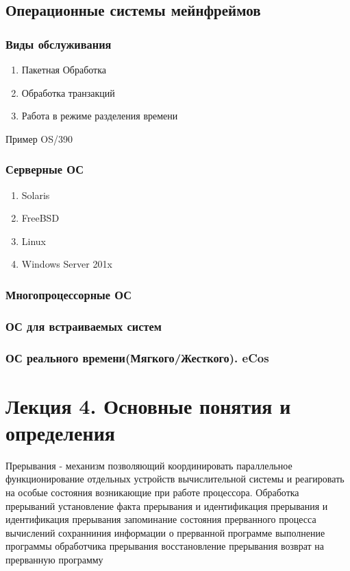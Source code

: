 \documentclass[a4paper]{article}
\begin{document}
\subsection{Операционные системы мейнфреймов}

\subsubsection{Виды обслуживания} 
\begin{enumerate}
\item Пакетная Обработка
\item Обработка транзакций
\item Работа в режиме разделения времени
\end{enumerate}

Пример OS/390

\subsubsection{Серверные ОС}
\begin{enumerate}
\item Solaris
\item FreeBSD
\item Linux
\item Windows Server 201x
\end{enumerate}

\subsubsection{Многопроцессорные ОС}
\subsubsection{ОС для встраиваемых систем}
\subsubsection{ОС реального времени(Мягкого/Жесткого). eCos}


\section{Лекция 4. Основные понятия и определения}
Прерывания - механизм позволяющий координировать параллельное функционирование отдельных устройств вычислительной системы и реагировать на особые состояния возникающие при работе процессора. 
Обработка прерываний
    установление факта прерывания и идентификация прерывания
    и идентификация прерывания
    запоминание состояния прерванного процесса вычислений
    сохранниния информации о прерванной программе
    выполнение программы обработчика прерывания
    восстановление прерывания
    возврат на прерванную программу
\end{document}
